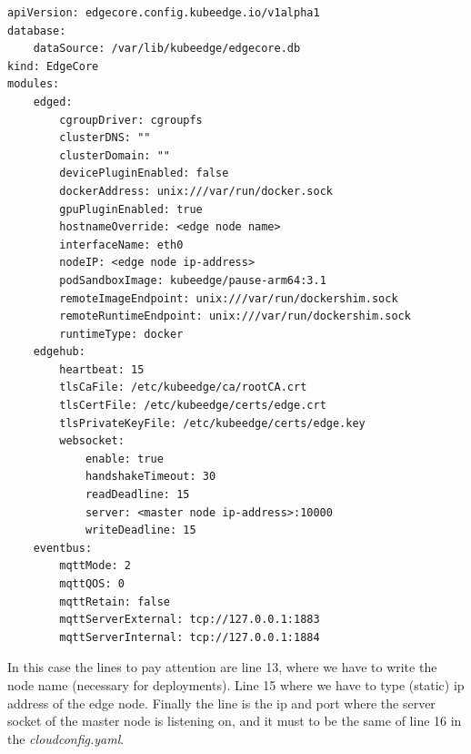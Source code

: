 \begin{verbatim}
apiVersion: edgecore.config.kubeedge.io/v1alpha1
database:
    dataSource: /var/lib/kubeedge/edgecore.db
kind: EdgeCore
modules:
    edged:
        cgroupDriver: cgroupfs
        clusterDNS: ""
        clusterDomain: ""
        devicePluginEnabled: false
        dockerAddress: unix:///var/run/docker.sock
        gpuPluginEnabled: true
        hostnameOverride: <edge node name>
        interfaceName: eth0
        nodeIP: <edge node ip-address>
        podSandboxImage: kubeedge/pause-arm64:3.1
        remoteImageEndpoint: unix:///var/run/dockershim.sock
        remoteRuntimeEndpoint: unix:///var/run/dockershim.sock
        runtimeType: docker
    edgehub:
        heartbeat: 15
        tlsCaFile: /etc/kubeedge/ca/rootCA.crt
        tlsCertFile: /etc/kubeedge/certs/edge.crt
        tlsPrivateKeyFile: /etc/kubeedge/certs/edge.key
        websocket:
            enable: true
            handshakeTimeout: 30
            readDeadline: 15
            server: <master node ip-address>:10000
            writeDeadline: 15
    eventbus:
        mqttMode: 2
        mqttQOS: 0
        mqttRetain: false
        mqttServerExternal: tcp://127.0.0.1:1883
        mqttServerInternal: tcp://127.0.0.1:1884
\end{verbatim}


In this case the lines to pay attention are line 13, where we have to write the node name (necessary for deployments). Line 15 where we have to type (static) ip address of the edge node. Finally the line is the ip and port where the server socket of the master node is listening on, and it must to be the same of line 16 in the \textit{cloudconfig.yaml}.


